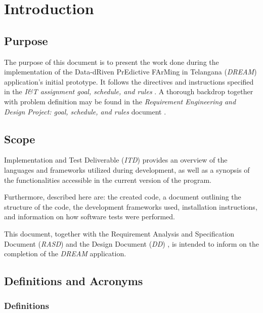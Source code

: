 \chapter{Introduction}

\section{Purpose}

The purpose of this document is to present the work done during the implementation of the Data-dRiven PrEdictive FArMing in Telangana (\textit{DREAM}) application's initial prototype. It follows the directives and instructions specified in the \textit{I\&T assignment goal, schedule, and rules} \cite{reference_doc2}. A thorough backdrop together with problem definition may be found in the \textit{Requirement Engineering and Design Project: goal, schedule, and rules} document \cite{reference_doc}.

\section{Scope}

Implementation and Test Deliverable (\textit{ITD}) provides an overview of the languages and frameworks utilized during development, as well as a synopsis of the functionalities accessible in the current version of the program.

Furthermore, described here are: the created code, a document outlining the structure of the code, the development frameworks used, installation instructions, and information on how software tests were performed.

This document, together with the Requirement Analysis and Specification Document (\textit{RASD}) \cite{rasd} and the Design Document (\textit{DD}) \cite{dd}, is intended to inform on the completion of the \textit{DREAM} application.

\section{Definitions and Acronyms}

\subsection{Definitions}

